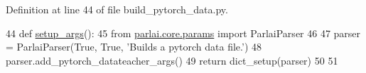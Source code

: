 Definition at line 44 of file build\+\_\+pytorch\+\_\+data.\+py.


\begin{DoxyCode}
44 \textcolor{keyword}{def }\hyperlink{namespaceparlai_1_1scripts_1_1build__pytorch__data_afd88c85ffdbc233b56542e013352351a}{setup\_args}():
45     \textcolor{keyword}{from} \hyperlink{namespaceparlai_1_1core_1_1params}{parlai.core.params} \textcolor{keyword}{import} ParlaiParser
46 
47     parser = ParlaiParser(\textcolor{keyword}{True}, \textcolor{keyword}{True}, \textcolor{stringliteral}{'Builds a pytorch data file.'})
48     parser.add\_pytorch\_datateacher\_args()
49     \textcolor{keywordflow}{return} dict\_setup(parser)
50 
51 
\end{DoxyCode}
